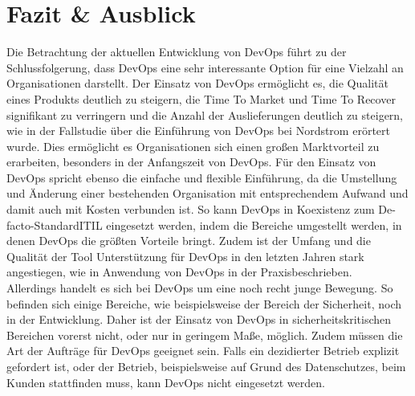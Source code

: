 \section{Fazit \& Ausblick}

Die Betrachtung der aktuellen Entwicklung von DevOps führt zu der Schlussfolgerung, dass DevOps eine sehr interessante Option für eine Vielzahl an Organisationen darstellt. Der Einsatz von DevOps ermöglicht es, die Qualität eines Produkts deutlich zu steigern, die Time To Market und Time To Recover signifikant zu verringern und die Anzahl der Auslieferungen deutlich zu steigern, wie in der Fallstudie über die Einführung von DevOps bei Nordstrom erörtert wurde. Dies ermöglicht es Organisationen sich einen großen Marktvorteil zu erarbeiten, besonders in der Anfangszeit von DevOps. 
Für den Einsatz von DevOps spricht ebenso die einfache und flexible Einführung, da die Umstellung und Änderung einer bestehenden Organisation mit entsprechendem Aufwand und damit auch mit Kosten verbunden ist. So kann DevOps in Koexistenz zum \glqq De-facto-Standard\grqq ITIL eingesetzt werden, indem die Bereiche umgestellt werden, in denen DevOps die größten Vorteile bringt. Zudem ist der Umfang und die Qualität der Tool Unterstützung für DevOps in den letzten Jahren stark angestiegen, wie in \glqq Anwendung von DevOps in der Praxis\grqq beschrieben.\\
Allerdings handelt es sich bei DevOps um eine noch recht junge Bewegung. So befinden sich einige Bereiche, wie beispielsweise der Bereich der Sicherheit, noch in der Entwicklung. Daher ist der Einsatz von DevOps in sicherheitskritischen Bereichen vorerst nicht, oder nur in geringem Maße, möglich. Zudem müssen die Art der Aufträge für DevOps geeignet sein. Falls ein dezidierter Betrieb explizit gefordert ist, oder der Betrieb, beispielsweise auf Grund des Datenschutzes, beim Kunden stattfinden muss, kann DevOps nicht eingesetzt werden.

